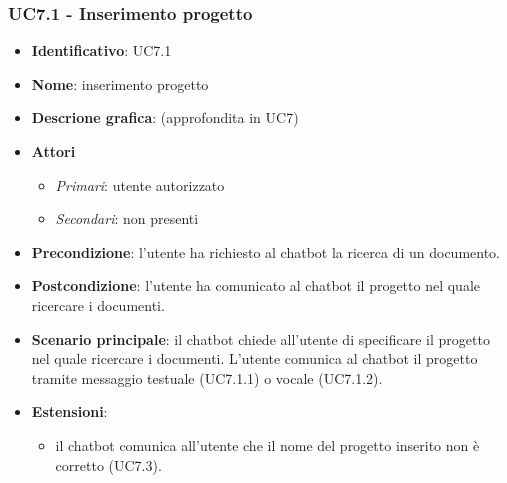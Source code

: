 \subsubsection{UC7.1 - Inserimento progetto}
\begin{itemize}
    \item \textbf{Identificativo}: UC7.1
    \item \textbf{Nome}: inserimento progetto
    \item \textbf{Descrione grafica}: (approfondita in UC7)
    \item \textbf{Attori}
 \begin{itemize} 
    \item \textit{Primari}: utente autorizzato
    \item \textit{Secondari}: non presenti
 \end{itemize}
 \item \textbf{Precondizione}: l'utente ha richiesto al chatbot la ricerca di un documento.
 \item \textbf{Postcondizione}:  l'utente ha comunicato al chatbot il progetto nel quale ricercare i documenti.
 \item \textbf{Scenario principale}: il chatbot chiede all'utente di specificare il progetto nel quale ricercare i documenti. L'utente comunica al chatbot il progetto tramite messaggio testuale (UC7.1.1) o vocale (UC7.1.2).
 \item \textbf{Estensioni}: 
 \begin{itemize} 
    \item il chatbot comunica all'utente che il nome del progetto inserito non è corretto (UC7.3).
 \end{itemize}
\end{itemize}
